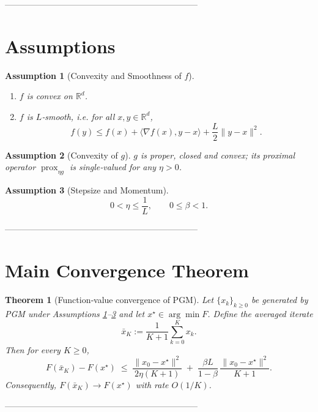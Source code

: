 \documentclass{article}
\newtheorem{theorem}{Theorem}
\newtheorem{assumption}{Assumption}
\newcommand{\prox}{\operatorname{prox}}
\newcommand{\R}{\mathbb{R}}
\newcommand{\inner}[2]{\langle #1,#2\rangle}
\newcommand{\norm}[1]{\|#1\|}
\begin{document}
--------------------------------------------------------------------

\section*{Assumptions}
\begin{assumption}[Convexity and Smoothness of $f$]\label{asmp:f}
\begin{enumerate}
    \item $f$ is convex on $\R^{d}$.
    \item $f$ is $L$‑smooth, i.e. for all $x,y\in\R^{d}$,
    \[
    f(y)\le f(x)+\inner{\nabla f(x)}{y-x}+\frac{L}{2}\norm{y-x}^{2}.
    \tag{A1}
    \]
\end{enumerate}
\end{assumption}

\begin{assumption}[Convexity of $g$]\label{asmp:g}
$g$ is proper, closed and convex; its proximal operator $\prox_{\eta g}$ is single‑valued for any $\eta>0$.
\end{assumption}

\begin{assumption}[Stepsize and Momentum]\label{asmp:params}
\[
0<\eta\le \frac{1}{L},\qquad 0\le\beta<1.
\tag{A2}
\]
\end{assumption}

--------------------------------------------------------------------

\section*{Main Convergence Theorem}
\begin{theorem}[Function‑value convergence of PGM]\label{thm:main}
Let $\{x_{k}\}_{k\ge0}$ be generated by PGM under Assumptions \ref{asmp:f}--\ref{asmp:params} and let $x^{\star}\in\arg\min F$.  
Define the averaged iterate 
\[
\bar x_{K}:=\frac{1}{K+1}\sum_{k=0}^{K}x_{k}.
\]
Then for every $K\ge0$,
\[
F(\bar x_{K})-F(x^{\star})\;\le\;
\frac{\norm{x_{0}-x^{\star}}^{2}}{2\eta (K+1)}\;+\;
\frac{\beta L}{1-\beta}\,\frac{\norm{x_{0}-x^{\star}}^{2}}{K+1}.
\tag{T1}
\]
Consequently, $F(\bar x_{K})\to F(x^{\star})$ with rate $O(1/K)$.
\end{theorem}

--------------------------------------------------------------------
\end{document}
